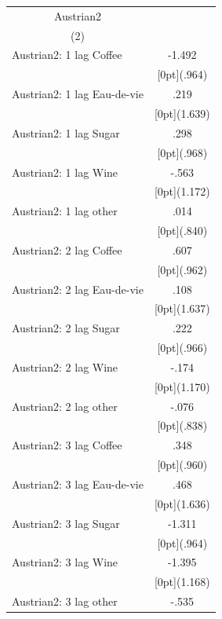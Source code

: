 \documentclass[12pt,a4paper,titlepage]{article}
\begin{document}
{\newpage
{}
\begin{tabular*}{\textwidth}{@{\extracolsep{\fill}}lc}	
	\multicolumn{1}{c}{Austrian2} \\
\cline{2-2}	
	\multicolumn{1}{c}{(2)} \\
\hline	
Austrian2: 1 lag Coffee &	-1.492 \\
&	\raisebox{.7ex}[0pt]{\scriptsize (.964)} \\
Austrian2: 1 lag Eau-de-vie &	.219 \\
&	\raisebox{.7ex}[0pt]{\scriptsize (1.639)} \\
Austrian2: 1 lag Sugar &	.298 \\
&	\raisebox{.7ex}[0pt]{\scriptsize (.968)} \\
Austrian2: 1 lag Wine &	-.563 \\
&	\raisebox{.7ex}[0pt]{\scriptsize (1.172)} \\
Austrian2: 1 lag other &	.014 \\
&	\raisebox{.7ex}[0pt]{\scriptsize (.840)} \\
Austrian2: 2 lag Coffee &	.607 \\
&	\raisebox{.7ex}[0pt]{\scriptsize (.962)} \\
Austrian2: 2 lag Eau-de-vie &	.108 \\
&	\raisebox{.7ex}[0pt]{\scriptsize (1.637)} \\
Austrian2: 2 lag Sugar &	.222 \\
&	\raisebox{.7ex}[0pt]{\scriptsize (.966)} \\
Austrian2: 2 lag Wine &	-.174 \\
&	\raisebox{.7ex}[0pt]{\scriptsize (1.170)} \\
Austrian2: 2 lag other &	-.076 \\
&	\raisebox{.7ex}[0pt]{\scriptsize (.838)} \\
Austrian2: 3 lag Coffee &	.348 \\
&	\raisebox{.7ex}[0pt]{\scriptsize (.960)} \\
Austrian2: 3 lag Eau-de-vie &	.468 \\
&	\raisebox{.7ex}[0pt]{\scriptsize (1.636)} \\
Austrian2: 3 lag Sugar &	-1.311 \\
&	\raisebox{.7ex}[0pt]{\scriptsize (.964)} \\
Austrian2: 3 lag Wine &	-1.395 \\
&	\raisebox{.7ex}[0pt]{\scriptsize (1.168)} \\
Austrian2: 3 lag other &	-.535 \\

\end{tabular*}}
\end{document}

